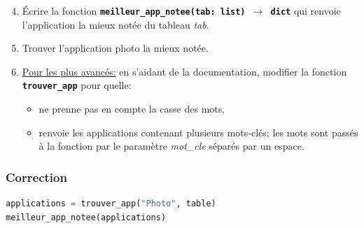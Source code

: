 \documentclass[svgnames,11pt]{beamer}
\begin{document}
\begin{frame}
    \frametitle{}
    \setcounter{compteuractivite}{3}
    \begin{activite}
        \begin{enumerate}
            \setcounter{enumi}{3}

            \item Écrire la fonction \textbf{\texttt{meilleur\_app\_notee(tab: list) $\rightarrow$ dict}} qui renvoie l'application la mieux notée du tableau \emph{tab}.
            \item Trouver l'application photo la mieux notée.
            \item \underline{Pour les plus avancés:} en s'aidant de la documentation, modifier la fonction \textbf{\texttt{trouver\_app}} pour quelle:
                  \begin{itemize}
                      \item ne prenne pas en compte la casse des mots,
                      \item renvoie les applications contenant plusieurs mots-clés; les mots sont passés à la fonction par le paramètre \emph{mot\_cle} séparés par un espace.
                  \end{itemize}
        \end{enumerate}
    \end{activite}

\end{frame}
\begin{frame}[fragile]
    \frametitle{Correction}

    
    \begin{center}
        \begin{lstlisting}[language=Python, basicstyle=\small]
applications = trouver_app("Photo", table)
meilleur_app_notee(applications)
\end{lstlisting}
    \end{center}

\end{frame}
\end{document}
